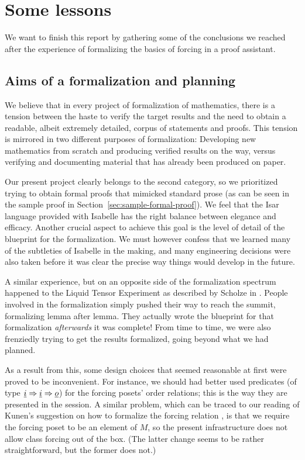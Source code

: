 \section{Some lessons}\label{sec:lessons}

We want to finish this report by gathering some of the conclusions we
reached after the experience of formalizing the basics of forcing in a
proof assistant.

\subsection{Aims of a formalization and planning}
\label{sec:aims-formalization-planning}

We believe that in every project of formalization of mathematics,
there is a tension between the haste to verify the target results and
the need to obtain a readable, albeit extremely detailed, corpus of
statements and proofs. This tension is mirrored in two different
purposes of formalization: Developing new mathematics from scratch and
producing verified results on the way, versus verifying and
documenting material that has already been produced on paper.

Our present project clearly belongs to the second category, so we
prioritized trying to obtain formal proofs that mimicked standard
prose (as can be seen in the sample proof in
Section~\ref{sec:sample-formal-proof}). We feel that the Isar language
provided with Isabelle has the right balance between elegance and
efficacy. Another crucial aspect to achieve this goal is the level of
detail of the blueprint for the formalization. We must however confess
that we learned many of the subtleties of Isabelle in the making, and
many engineering decisions were also taken before it was clear the
precise way things would develop in the future.

A similar experience, but on an opposite side of the formalization
spectrum happened to the Liquid Tensor Experiment \cite{nature-lte} as described by Scholze
in \cite{LTE2021}. People involved in the formalization simply pushed
their way to reach the summit, formalizing lemma after lemma. They
actually wrote the blueprint for that formalization \emph{afterwards}
it was complete! From time to time, we were also frenziedly trying to
get the results formalized, going beyond what we had planned.

As a result from this, some design choices that seemed reasonable at
first were proved to be inconvenient. For instance, we should had
better used predicates (of type $\tyi\fun\tyi\fun\tyo$) for the
forcing posets' order relations; this is the way they
are presented in the  session. A similar
problem, which can be traced to our reading of Kunen's suggestion on
how to formalize the forcing relation \cite[p.~260]{kunen2011set},
is that we require the forcing poset to be an element of $M$,
so the present infrastructure does not allow class forcing out of the
box. (The latter change seems to be rather straightforward, but the
former does not.)


